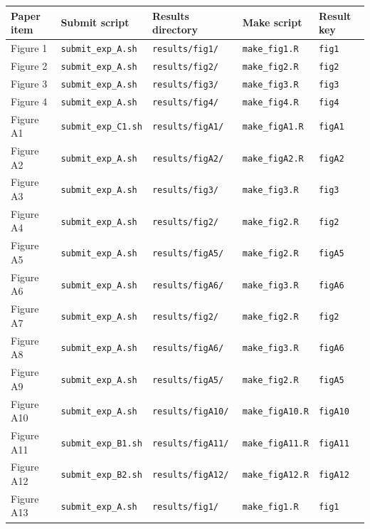 \begin{tabular}{lllll}
\toprule
Paper item & Submit script & Results directory & Make script & Result key \\
\midrule
Figure 1 & \texttt{submit\_exp\_A.sh} & \texttt{results/fig1/} & \texttt{make\_fig1.R} & \texttt{fig1} \\
Figure 2 & \texttt{submit\_exp\_A.sh} & \texttt{results/fig2/} & \texttt{make\_fig2.R} & \texttt{fig2} \\
Figure 3 & \texttt{submit\_exp\_A.sh} & \texttt{results/fig3/} & \texttt{make\_fig3.R} & \texttt{fig3} \\
Figure 4 & \texttt{submit\_exp\_A.sh} & \texttt{results/fig4/} & \texttt{make\_fig4.R} & \texttt{fig4} \\
Figure A1 & \texttt{submit\_exp\_C1.sh} & \texttt{results/figA1/} & \texttt{make\_figA1.R} & \texttt{figA1} \\
Figure A2 & \texttt{submit\_exp\_A.sh} & \texttt{results/figA2/} & \texttt{make\_figA2.R} & \texttt{figA2} \\
Figure A3 & \texttt{submit\_exp\_A.sh} & \texttt{results/fig3/} & \texttt{make\_fig3.R} & \texttt{fig3} \\
Figure A4 & \texttt{submit\_exp\_A.sh} & \texttt{results/fig2/} & \texttt{make\_fig2.R} & \texttt{fig2} \\
Figure A5 & \texttt{submit\_exp\_A.sh} & \texttt{results/figA5/} & \texttt{make\_fig2.R} & \texttt{figA5} \\
Figure A6 & \texttt{submit\_exp\_A.sh} & \texttt{results/figA6/} & \texttt{make\_fig3.R} & \texttt{figA6} \\
Figure A7 & \texttt{submit\_exp\_A.sh} & \texttt{results/fig2/} & \texttt{make\_fig2.R} & \texttt{fig2} \\
Figure A8 & \texttt{submit\_exp\_A.sh} & \texttt{results/figA6/} & \texttt{make\_fig3.R} & \texttt{figA6} \\
Figure A9 & \texttt{submit\_exp\_A.sh} & \texttt{results/figA5/} & \texttt{make\_fig2.R} & \texttt{figA5} \\
Figure A10 & \texttt{submit\_exp\_A.sh} & \texttt{results/figA10/} & \texttt{make\_figA10.R} & \texttt{figA10} \\
Figure A11 & \texttt{submit\_exp\_B1.sh} & \texttt{results/figA11/} & \texttt{make\_figA11.R} & \texttt{figA11} \\
Figure A12 & \texttt{submit\_exp\_B2.sh} & \texttt{results/figA12/} & \texttt{make\_figA12.R} & \texttt{figA12} \\
Figure A13 & \texttt{submit\_exp\_A.sh} & \texttt{results/fig1/} & \texttt{make\_fig1.R} & \texttt{fig1} \\

\end{tabular}
